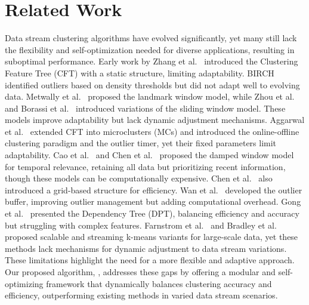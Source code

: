 \section{Related Work} 
\label{sec:relatedwork} 
Data stream clustering algorithms have evolved significantly, yet many still lack the flexibility and self-optimization needed for diverse applications, resulting in suboptimal performance. Early work by Zhang et al.~\cite{zhang1997birch} introduced the Clustering Feature Tree (CFT) with a static structure, limiting adaptability. BIRCH~\cite{BIRCH:96} identified outliers based on density thresholds but did not adapt well to evolving data. Metwally et al.~\cite{metwally2005duplicate} proposed the landmark window model, while Zhou et al.~\cite{zhou2008tracking} and Borassi et al.~\cite{SL-KMeans:20} introduced variations of the sliding window model. These models improve adaptability but lack dynamic adjustment mechanisms. Aggarwal et al.~\cite{Clustream:03} extended CFT into microclusters (MCs) and introduced the online-offline clustering paradigm and the outlier timer, yet their fixed parameters limit adaptability. Cao et al.~\cite{cao2006density} and Chen et al.~\cite{DStream:2007} proposed the damped window model for temporal relevance, retaining all data but prioritizing recent information, though these models can be computationally expensive. Chen et al.~\cite{DStream:2007} also introduced a grid-based structure for efficiency. Wan et al.~\cite{DenStream:06} developed the outlier buffer, improving outlier management but adding computational overhead. Gong et al.~\cite{EDMStream:17} presented the Dependency Tree (DPT), balancing efficiency and accuracy but struggling with complex features. Farnstrom et al.~\cite{farnstrom2000scalability} and Bradley et al.~\cite{bradley2002scaling} proposed scalable and streaming k-means variants for large-scale data, yet these methods lack mechanisms for dynamic adjustment to data stream variations. These limitations highlight the need for a more flexible and adaptive approach. Our proposed algorithm, \algo, addresses these gaps by offering a modular and self-optimizing framework that dynamically balances clustering accuracy and efficiency, outperforming existing methods in varied data stream scenarios.








